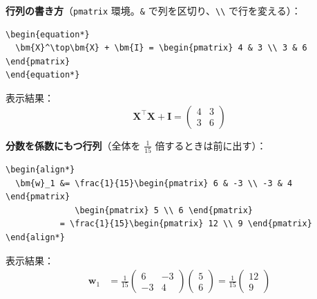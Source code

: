 \documentclass[a4paper,dvipdfmx]{jsarticle}
\newcommand{\提出期限}{2026年11月2日（月）}
\newcommand{\学籍番号}{0000000}
\newcommand{\氏名}{氏名を書く}
\newcommand{\提出日}{2026年11月2日}
\begin{document}
\noindent
\textbf{行列の書き方}（\verb|pmatrix| 環境。\verb|&| で列を区切り、\verb|\\| で行を変える）：
\begin{verbatim}
\begin{equation*}
  \bm{X}^\top\bm{X} + \bm{I} = \begin{pmatrix} 4 & 3 \\ 3 & 6 \end{pmatrix}
\end{equation*}
\end{verbatim}
表示結果：
\begin{equation*}
  \bm{X}^\top\bm{X} + \bm{I} = \begin{pmatrix} 4 & 3 \\ 3 & 6 \end{pmatrix}
\end{equation*}

\noindent
\textbf{分数を係数にもつ行列}（全体を $\frac{1}{15}$ 倍するときは前に出す）：
\begin{verbatim}
\begin{align*}
  \bm{w}_1 &= \frac{1}{15}\begin{pmatrix} 6 & -3 \\ -3 & 4 \end{pmatrix}
              \begin{pmatrix} 5 \\ 6 \end{pmatrix}
           = \frac{1}{15}\begin{pmatrix} 12 \\ 9 \end{pmatrix}
\end{align*}
\end{verbatim}
表示結果：
\begin{align*}
  \bm{w}_1 &= \frac{1}{15}\begin{pmatrix} 6 & -3 \\ -3 & 4 \end{pmatrix}
              \begin{pmatrix} 5 \\ 6 \end{pmatrix}
           = \frac{1}{15}\begin{pmatrix} 12 \\ 9 \end{pmatrix}
\end{align*}
\end{document}
